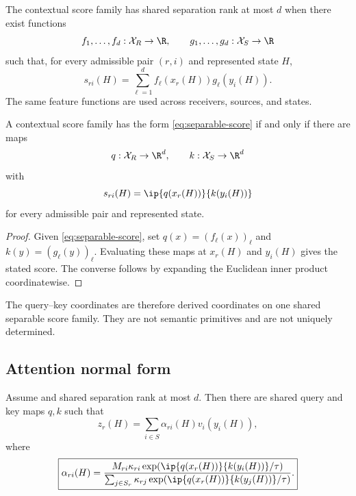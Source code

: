 \begin{definition}\label{def:shared-separation-rank}
The contextual score family has shared separation rank at most $d$ when there exist functions
\[
f_1,\ldots,f_d:\mathcal X_R\to\R,
\qquad
g_1,\ldots,g_d:\mathcal X_S\to\R
\]
such that, for every admissible pair $(r,i)$ and represented state $H$,
\begin{equation}\label{eq:separable-score}
s_{ri}(H)
=
\sum_{\ell=1}^{d}f_\ell(x_r(H))g_\ell(y_i(H)).
\end{equation}
The same feature functions are used across receivers, sources, and states.
\end{definition}

\begin{proposition}\label{prop:separable-bilinear}
A contextual score family has the form \eqref{eq:separable-score} if and only if there are maps
\[
q:\mathcal X_R\to\R^d,
\qquad
k:\mathcal X_S\to\R^d
\]
with
\[
s_{ri}(H)=\ip{q(x_r(H))}{k(y_i(H))}
\]
for every admissible pair and represented state.
\end{proposition}

\begin{proof}
Given \eqref{eq:separable-score}, set $q(x)=(f_\ell(x))_\ell$ and $k(y)=(g_\ell(y))_\ell$. Evaluating these maps at $x_r(H)$ and $y_i(H)$ gives the stated score. The converse follows by expanding the Euclidean inner product coordinatewise.
\end{proof}

The query--key coordinates are therefore derived coordinates on one shared separable score family. They are not semantic primitives and are not uniquely determined.

\subsection{Attention normal form}

\begin{theorem}\label{thm:attention-normal-form}
Assume  and shared separation rank at most $d$. Then there are shared query and key maps $q,k$ such that
\begin{equation}\label{eq:attention-normal-form}
\boxed{
z_r(H)=\sum_{i\in S}\alpha_{ri}(H)v_i(y_i(H)),
}
\end{equation}
where
\begin{equation}\label{eq:attention-weights}
\boxed{
\alpha_{ri}(H)
=
\frac{
M_{ri}\kappa_{ri}
\exp\!\left(\ip{q(x_r(H))}{k(y_i(H))}/\tau\right)
}{
\sum_{j\in S_r}\kappa_{rj}
\exp\!\left(\ip{q(x_r(H))}{k(y_j(H))}/\tau\right)
}.
}
\end{equation}
\end{theorem}

